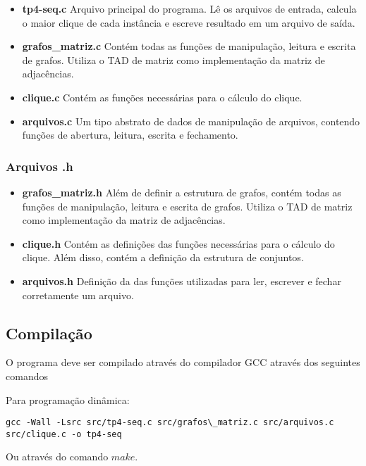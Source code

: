 \documentclass[12pt]{article}
\begin{document}
\begin{itemize}
\item \textbf{tp4-seq.c} Arquivo principal do programa. Lê os arquivos de entrada, calcula o maior clique de cada instância e escreve resultado em um arquivo de saída.
\item \textbf{grafos\_matriz.c} Contém todas as funções de manipulação, leitura e escrita de grafos. Utiliza o TAD de matriz como implementação da matriz de adjacências.
\item \textbf{clique.c} Contém as funções necessárias para o cálculo do clique.
\item \textbf{arquivos.c} Um tipo abstrato de dados de manipulação de arquivos, contendo funções de abertura, leitura, escrita e fechamento.
\end{itemize}

\subsubsection{Arquivos .h}

\begin{itemize}
\item \textbf{grafos\_matriz.h} Além de definir a estrutura de grafos, contém todas as funções de manipulação, leitura e escrita de grafos. Utiliza o TAD de matriz como implementação da matriz de adjacências.
\item \textbf{clique.h} Contém as definições das funções necessárias para o cálculo do clique. Além disso, contém a definição da estrutura de conjuntos.
\item \textbf{arquivos.h} Definição da das funções utilizadas para ler, escrever e fechar corretamente um arquivo.
\end{itemize}

\subsection{Compilação}

O programa deve ser compilado através do compilador GCC através dos seguintes comandos

Para programação dinâmica:
\begin{footnotesize}
\begin{verbatim}
gcc -Wall -Lsrc src/tp4-seq.c src/grafos\_matriz.c src/arquivos.c src/clique.c -o tp4-seq \end{verbatim}
\end{footnotesize}

Ou através do comando $make$.
\end{document}
